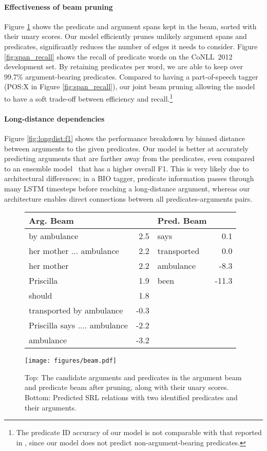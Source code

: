 \documentclass[11pt,a4paper]{article}
\begin{document}
\paragraph{Effectiveness of beam pruning}
Figure \ref{fig:beams} shows the predicate and argument spans kept in the beam, sorted with their unary scores.
Our model efficiently prunes unlikely argument spans and predicates, significantly reduces the number of edges it needs to consider. Figure \ref{fig:span_recall} shows the recall of predicate words on the CoNLL~2012 development set. By retaining  predicates per word, we are able to keep over 99.7\% argument-bearing predicates. Compared to having a part-of-speech tagger (POS:X in Figure \ref{fig:span_recall}), our joint beam pruning allowing the model to have a soft trade-off between efficiency and recall.\footnote{The predicate ID accuracy of our model is not comparable with that reported in , since our model does not predict non-argument-bearing predicates.}


\paragraph{Long-distance dependencies}
Figure \ref{fig:longdist:f1} shows the performance breakdown by binned distance between arguments to the given predicates. Our model is better at accurately predicting arguments that are farther away from the predicates, even compared to an ensemble model~\cite{He2017DeepSR} that has a higher overall F1.
This is very likely due to architectural differences; in a BIO tagger, predicate information passes through many LSTM timesteps before reaching a long-distance argument, whereas our architecture enables direct connections between all predicates-arguments pairs.


\begin{figure}[t]
\centering
\footnotesize
\begin{tabularx}{\linewidth}{lrlr}
\toprule
Arg. Beam  &    & Pred. Beam  &       \\
\midrule
by ambulance& 2.5& says& 0.1\\
her mother ... ambulance& 2.2& transported& 0.0\\
her mother& 2.2& ambulance&-8.3\\
Priscilla& 1.9& been&-11.3\\
should& 1.8&&  \\
transported by ambulance&-0.3&&\\
Priscilla says .... ambulance&-2.2&&\\
ambulance&-3.2&&\\    
\midrule
\end{tabularx}
\texttt{[image: figures/beam.pdf]}
\vspace{-1em}
\caption{Top: The candidate arguments and predicates in the argument beam  and predicate beam  after pruning, along with their unary scores. Bottom: Predicted SRL relations with two identified predicates and their arguments.}\label{fig:beams}
\end{figure} 
\end{document}
